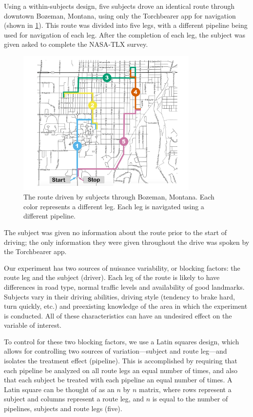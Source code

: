 Using a within-subjects design, five subjects drove an identical route through downtown Bozeman, Montana, using only the Torchbearer app for navigation (shown in \ref{fig:route}). This route was divided into five legs, with a different pipeline being used for navigation of each leg. After the completion of each leg, the subject was given asked to complete the NASA-TLX survey.

\begin{figure}[htbp]
  \centering
  \includegraphics[width=0.8\textwidth]{images/route.pdf}
  \caption{The route driven by subjects through Bozeman, Montana. Each color represents a different leg. Each leg is navigated using a different pipeline.}
  \label{fig:route}
\end{figure}

The subject was given no information about the route prior to the start of driving; the only information they were given throughout the drive was spoken by the Torchbearer app. 

Our experiment has two sources of nuisance variability, or blocking factors: the route leg and the subject (driver). Each leg of the route is likely to have differences in road type, normal traffic levels and availability of good landmarks. Subjects vary in their driving abilities, driving style (tendency to brake hard, turn quickly, etc.) and preexisting knowledge of the area in which the experiment is conducted. All of these characteristics can have an undesired effect on the variable of interest. 

To control for these two blocking factors, we use a Latin squares design, which allows for controlling two sources of variation---subject and route leg---and isolates the treatment effect (pipeline). This is accomplished by requiring that each pipeline be analyzed on all route legs an equal number of times, and also that each subject be treated with each pipeline an equal number of times. A Latin square can be thought of as an $n$ by $n$ matrix, where rows represent a subject and columns represent a route leg, and $n$ is equal to the number of pipelines, subjects and route legs (five).

